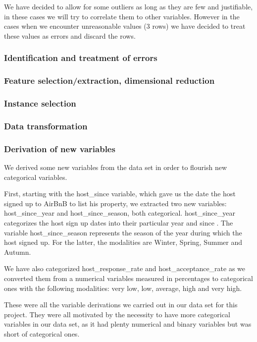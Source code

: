 We have decided to allow for some outliers as long as they are few and justifiable, in these cases we 
will try to correlate them to other variables. However in the cases when we encounter unreasonable 
values (3 rows) we have decided to treat these values as errors and discard the rows.

\subsubsection{Identification and treatment of errors}
\subsubsection{Feature selection/extraction, dimensional reduction}
\subsubsection{Instance selection}
\subsubsection{Data transformation}
\subsubsection{Derivation of new variables}
We derived some new variables from the data set in order to flourish new categorical variables.

First, starting with the host\_since variable, which gave us the date the host signed up to AirBnB
to list his property, we extracted two new variables: host\_since\_year and host\_since\_season,
both categorical. host\_since\_year categorizes the host sign up dates into their particular year and since . 
The variable host\_since\_season represents the season of the year during which
the host signed up. For the latter, the modalities are Winter, Spring, Summer and Autumn.

We have also categorized host\_response\_rate and host\_acceptance\_rate
as we converted them from a numerical variables measured in percentages to 
categorical ones with the following modalities: very low, low, average, 
high and very high. 

These were all the variable derivations we carried out in our data set for this 
project. They were all motivated by the necessity to have more categorical
variables in our data set, as it had plenty numerical and binary variables
but was short of categorical ones.



